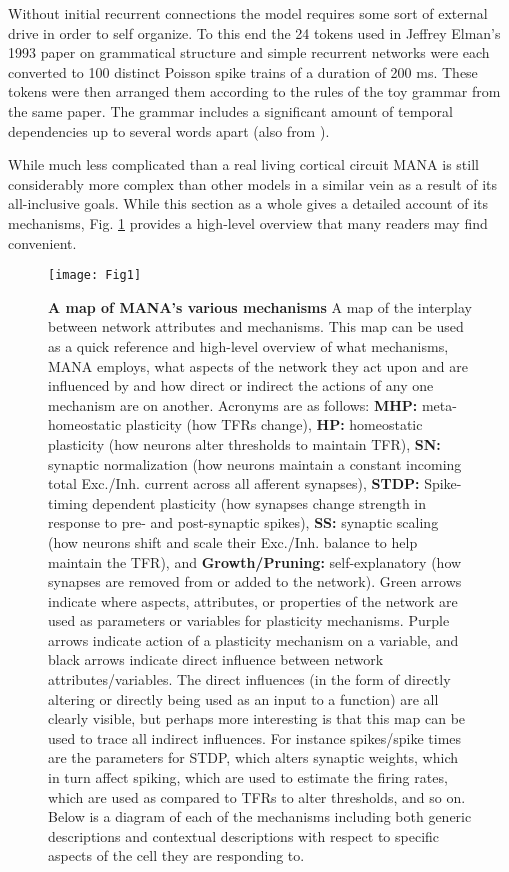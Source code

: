 \documentclass[10pt,letterpaper]{article}
\begin{document}
Without initial recurrent connections the model requires some sort of external drive in order to self organize. To this end the 24 tokens used in Jeffrey Elman's 1993 paper on grammatical structure and simple recurrent networks \cite{elman1991distributed} were each converted to 100 distinct Poisson spike trains of a duration of 200 ms. These tokens were then arranged them according to the rules of the toy grammar from the same paper. The grammar includes a significant amount of temporal dependencies up to several words apart (also from \cite{elman1991distributed}). 

While much less complicated than a real living cortical circuit MANA is still considerably more complex than other models in a similar vein as a result of its all-inclusive goals. While this section as a whole gives a detailed account of its mechanisms, Fig. \ref{Fig1} provides a high-level overview that many readers may find convenient. 

\begin{figure}[!h]
\texttt{[image: Fig1]}
\caption{{\bf A map of MANA's various mechanisms}
 \footnotesize A map of the interplay between network attributes and mechanisms. This map can be used as a quick reference and high-level overview of what mechanisms, MANA employs, what aspects of the network they act upon and are influenced by and how direct or indirect the actions of any one mechanism are on another. Acronyms are as follows: \textbf{MHP:} meta-homeostatic plasticity (how TFRs change), \textbf{HP:} homeostatic plasticity (how neurons alter thresholds to maintain TFR), \textbf{SN:} synaptic normalization (how neurons maintain a constant incoming total Exc./Inh. current across all afferent synapses), \textbf{STDP:} Spike-timing dependent plasticity (how synapses change strength in response to pre- and post-synaptic spikes), \textbf{SS:} synaptic scaling (how neurons shift and scale their Exc./Inh. balance to help maintain the TFR), and \textbf{Growth/Pruning:} self-explanatory (how synapses are removed from or added to the network).  Green arrows indicate where aspects, attributes, or properties of the network are used as parameters or variables for plasticity mechanisms. Purple arrows indicate action of a plasticity mechanism on a variable, and black arrows indicate direct influence between network attributes/variables. The direct influences (in the form of directly altering or directly being used as an input to a function) are all clearly visible, but perhaps more interesting is that this map can be used to trace all indirect influences. For instance spikes/spike times are the parameters for STDP, which alters synaptic weights, which in turn affect spiking, which are used to estimate the firing rates, which are used as compared to TFRs to alter thresholds, and so on. Below is a diagram of each of the mechanisms including both generic descriptions and contextual descriptions with respect to specific aspects of the cell they are responding to. 
 }
\label{Fig1}
\end{figure}
\end{document}
